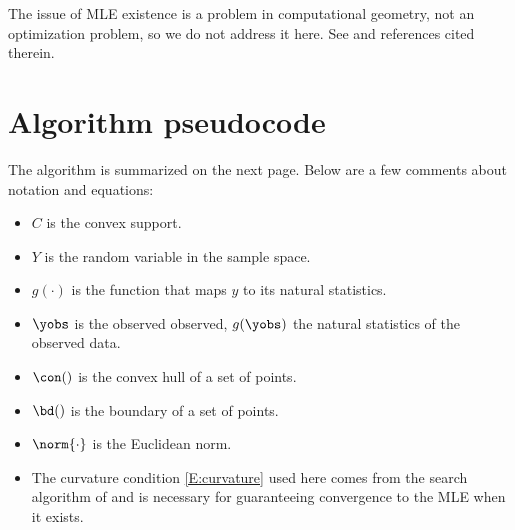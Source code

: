 The issue of MLE existence is a problem in computational geometry, not an optimization 
problem, so we do not address it 
here.  See \citep{Geyer:gdor,Rinaldo:2009} and references cited therein.


\chapter{Algorithm pseudocode}
The algorithm is summarized on the next page.  Below are a few comments about notation 
and equations:
\begin{itemize}
\item $C$ is the convex support.
\item $Y$ is the random variable in the sample space.
\item $g(\cdot)$ is the function that maps $y$ to its natural statistics.
\item $\yobs$ is the observed observed, $g(\yobs)$ the natural statistics of the observed data.
\item $\con()$ is the convex hull of a set of points.
\item $\bd()$ is the boundary of a set of points.
\item $\norm{\cdot}$ is the Euclidean norm.
\item The curvature condition \eqref{E:curvature} used here comes from the search 
algorithm of \citet{Okabayashi:longrange} and is necessary for guaranteeing 
convergence to the MLE when it exists.
\end{itemize}
\newpage

